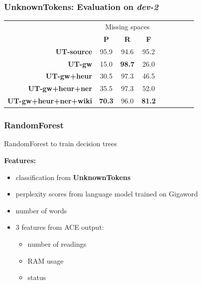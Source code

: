 \documentclass[table]{beamer}
\begin{document}
\begin{frame}
  \frametitle{\textbf{UnknownTokens}: Evaluation on \textit{dev-2}}
  \begin{tabular}{r|c|c|c|c|c|c|c|c|}
  & \multicolumn{3}{c|}{Missing spaces}\\
  & \textbf{P} & \textbf{R} & \textbf{F}\\
  \hline
  \textbf{UT-source} & 95.9 & 94.6 & 95.2\\
  \hline\hline\pause
  \textbf{UT-gw} & 15.0 & \textbf{98.7} & 26.0\\
  \hline\pause
  \textbf{UT-gw+heur} & 30.5 & 97.3 & 46.5\\
  \hline\pause
  \textbf{UT-gw+heur+ner} & 35.5 & 97.3 & 52.0\\
  \hline\pause
  \textbf{UT-gw+heur+ner+wiki} & \textbf{70.3} & 96.0 & \textbf{81.2}\\
  \hline
  \end{tabular}
\end{frame}

\begin{frame}
  \frametitle{\textbf{RandomForest}}
  RandomForest \citep{breiman2001random} to train decision trees
  \vspace{0.6cm}

  \textbf{Features:}\pause
  \begin{itemize}
    \item classification from \textbf{UnknownTokens}\pause
    \item perplexity scores from language model trained on Gigaword\pause
    \item number of words\pause
    \item 3 features from ACE \citep{ace} output:
    \begin{itemize}
      \item number of readings
      \item RAM usage
      \item status
    \end{itemize}
  \end{itemize}
\end{frame}
\end{document}
